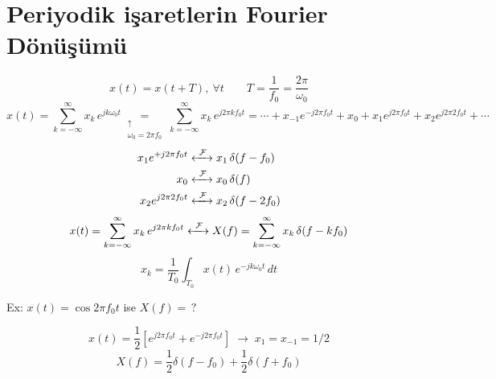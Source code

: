 \documentclass[11pt,a4paper]{article}
\begin{document}
\section{Periyodik işaretlerin Fourier Dönüşümü}
\[ x(t)=x(t+T),\ \forall t \qquad T=\frac{1}{f_0}=\frac{2\pi}{\omega_0} \]
\[ x(t)=\sum_{k=-\infty}^{\infty} x_k\,e^{jk\omega_0t}\underset{\substack{\uparrow\\ \omega_0=2\pi f_0}}{=}\sum_{k=-\infty}^{\infty} x_k\,e^{j2\pi kf_0t}=\cdots+x_{-1}e^{-j2\pi f_0t}+x_0+x_1e^{j2\pi f_0t}+x_2e^{j2\pi 2f_0t}+\cdots \]
\begin{align*}
x_1e^{+j2\pi f_0t} &\xleftrightarrow{\ \mathcal{F}\ } x_1\,\delta(f-f_0)\\
x_0 &\xleftrightarrow{\ \mathcal{F}\ } x_0\,\delta(f)\\
x_2e^{j2\pi 2f_0t} &\xleftrightarrow{\ \mathcal{F}\ } x_2\,\delta(f-2f_0)
\end{align*}
\[ x(t)=\sum_{k=-\infty}^{\infty} x_k\,e^{j2\pi kf_0t} \xleftrightarrow{\ \mathcal{F}\ } X(f)=\sum_{k=-\infty}^{\infty} x_k\,\delta(f-kf_0) \]
\[ x_k=\frac{1}{T_0}\int_{T_0} x(t)\,e^{-jk\omega_0t}\,dt \]

\begin{ornek}
Ex: $x(t)=\cos 2\pi f_0t$ ise $X(f)=\,?$
\end{ornek}
\[ x(t)=\frac{1}{2}\left[e^{j2\pi f_0t}+e^{-j2\pi f_0t}\right] \;\longrightarrow\; x_1=x_{-1}=1/2 \]
\[ X(f)=\frac{1}{2}\delta(f-f_0)+\frac{1}{2}\delta(f+f_0) \]
\begin{center}
\end{center}
\end{document}
